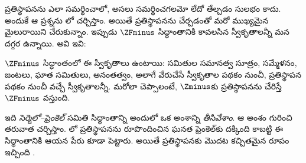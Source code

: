 \documentclass[../../../include/open-logic-section]{subfiles}
\begin{document}

ప్రతిస్థాపనను ఎలా సమర్థించాలో, అసలు సమర్థించగలమో లేదో
తేల్చడం సులభం కాదు. అందుకే ఆ ప్రశ్నను
లో చర్చిస్తాం. అయితే
ప్రతిస్థాపనను చేర్చడంతో మరో ముఖ్యమైన మైలురాయిని
చేరుకున్నాం. ఇప్పుడు $\ZFminus$ సిద్ధాంతానికి కావలసిన
స్వీకృతాలన్నీ మన దగ్గర ఉన్నాయి. అవి ఇవి:

\begin{defn}
$\ZFminus$ సిద్ధాంతంలో
ఈ స్వీకృతాలు ఉంటాయి:
సమితుల సమానత్వ సూత్రం,
సమ్మేళనం, జంటలు,
ఘాత సమితులు, అనంతత్వం,
అలాగే వేరుచేసే స్వీకృతాల పథకం నుంచీ, ప్రతిస్థాపన పథకం నుంచీ
వచ్చే స్వీకృతాలన్నీ.
మరోలా చెప్పాలంటే, $\Zminus$కు ప్రతిస్థాపనను
చేరిస్తే $\ZFminus$ వస్తుంది.
\end{defn}
\noindent
ఇది \emph{సెర్మెలో--ఫ్రెంకెల్} సమితి సిద్ధాంతాన్ని
అందులో ఒక అంశాన్ని \emph{తీసివేశాం}.
ఆ అంశం గురించి తరువాత చర్చిస్తాం.
\citeyear{Fraenkel1922}లో ప్రతిస్థాపనను రూపొందించిన
ఘనత ఫ్రెంకెల్‌కు దక్కింది కాబట్టి ఈ సిద్ధాంతానికి
ఆయన పేరు కూడా పెట్టారు. అయితే ప్రతిస్థాపనకు మొదట
కచ్చితమైన రూపం ఇచ్చింది \citet{Skolem1922}.
\end{document}
